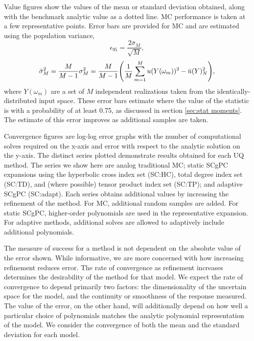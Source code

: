 Value figures show the values of the mean or standard deviation obtained, along with the benchmark analytic
value as a dotted line.  MC performance is taken at a few representative points.  Error bars are provided
for MC and are estimated using the population variance,
\begin{equation}
  \epsilon_{95} = \frac{2\bar\sigma_M}{\sqrt{M}},
\end{equation}
\begin{equation}
  \bar\sigma_M^2 = \frac{M}{M-1}\sigma^2_M = \frac{M}{M-1}\qty(\frac{1}{M}\sum_{m=1}^M u(Y(\omega_m))^2 - \bar
  u(Y)^2_N),
\end{equation}
where $Y(\omega_m)$ are a set of $M$ independent realizations taken from the identically-distributed input space.
These error bars estimate where the value of the statistic is with a probability of at least 0.75, as discussed in
section \ref{sec:stat moments}.  The estimate of
this error improves as additional samples are taken.

Convergence figures are
log-log error graphs with the number of computational solves required on the x-axis and error with respect to the analytic
solution on the y-axis.  The distinct series plotted demonstrate results obtained for each UQ method.  
The series we show here are analog traditional MC; static 
SCgPC expansions using the hyperbolic
cross index set (SC:HC), total degree index set (SC:TD), and (where possible) tensor product index set (SC:TP); 
and adaptive SCgPC (SC:adapt).
Each
series obtains additional values by increasing the refinement of the method.  For MC, additional
random samples are added.  For static SCgPC, higher-order polynomials are used in the representative expansion.  For
adaptive methods, additional solves are allowed to adaptively include additional polynomials.

The measure of success for a method is not dependent on the absolute value of the error shown.  While
informative, we are more concerned with how increasing refinement reduces error.  The
rate of convergence as refinement increases determines the desirability of the method for that model.  We
expect the rate of convergence to depend primarily two factors: the dimensionality of the uncertain space for the
model, and the continuity or smoothness of the response measured.  The value of the error, on the other hand, will additionally
depend on how well a particular choice of polynomials matches the analytic polynomial representation of the model.
We consider the convergence of both the mean and the standard deviation for each model.

